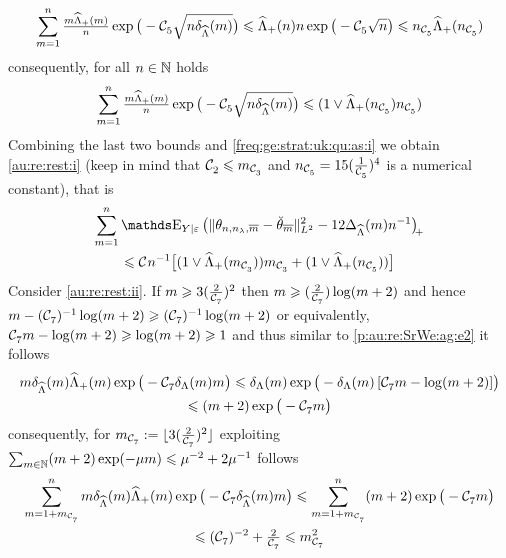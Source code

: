 \begin{pro}
 \begin{equation*}
    \sum_{\Di=1}^{\ssY}\tfrac{\Di\meiSv}{\ssY}\exp\big(-\cst{5}\sqrt{\ssY\cmeiSv}\big)\leq 
     \meiSv[\ssY]\ssY\exp\big(-\cst{5}\sqrt{\ssY}\big)\leq\ssY_{\cst{5}}\meiSv[\ssY_{\cst{5}}]
   \end{equation*}
  consequently, for all $\ssY\in\Nz$ holds
  \begin{displaymath}
  \sum_{\Di=1}^{\ssY}\tfrac{\Di\meiSv}{\ssY}\exp\big(-\cst{5}\sqrt{\ssY\cmeiSv}\big)\leq (1\vee\meiSv[\ssY_{\cst{5}}]\ssY_{\cst{5}})
 \end{displaymath}
 Combining the last two bounds and  \ref{freq:ge:strat:uk:qu:as:i} we
 obtain \ref{au:re:rest:i} (keep in mind that
 $\cst{2}\leq\Di_{\cst{3}}$ and $\ssY_{\cst{5}}=15(\tfrac{1}{\cst{5}})^4$ is a numerical constant), that is 
 \begin{multline*}
  \sum_{\Di=1}^{\ssY}\E_{Y\vert \epsilon} \vectp{\VnormLp{\hxdfPr-\dxdfPr}^2 - 12\DiepenSv\ssY^{-1}} \\
 \leq \cst{}\ssY^{-1}\big[(1\vee\meiSv[\Di_{\cst{3}}])\Di_{\cst{3}}+(1\vee\meiSv[\ssY_{\cst{5}}])\big]
 \end{multline*}
 Consider  \ref{au:re:rest:ii}.
 If   $\Di\geq 3(\tfrac{2}{\cst{7}})^2$ then 
 $\Di\geq  (\tfrac{2}{\cst{7}})\log(\Di+2)$ and
 hence
 $\Di-(\cst{7})^{-1}\log(\Di+2)\geq(\cst{7})^{-1}\log(\Di+2)$
 or equivalently,
 $\cst{7}\Di-\log(\Di+2)\geq\log(\Di+2)\geq1$
 and thus similar to \eqref{p:au:re:SrWe:ag:e2} it follows
 \begin{multline*}
 \Di\cmeiSv\meiSv\exp\big(-\cst{7}\cmSv\Di\big)\leq
 \cmSv\exp\big(-\cmSv\,[\cst{7}\Di-\log(\Di+2)]\big)\\\leq
 (\Di+2)\exp\big(-\cst{7}\Di\big)%
 \end{multline*}
 consequently, for $\Di_{\cst{7}}:=\floor{3(\tfrac{2}{\cst{7}})^2}$ exploiting $\sum_{\Di\in\Nz}(\Di+2)\exp(-\mu\Di)\leq \mu^{-2}+ 2\mu^{-1}$
 follows
 \begin{multline*}
 \sum_{\Di=1+\Di_{\cst{7}}}^{\ssY}\Di\cmeiSv\meiSv\exp\big(-\cst{7}\cmeiSv\Di\big)\leq
 \sum_{\Di=1+\Di_{\cst{7}}}^{\ssY}(\Di+2)\exp\big(-\cst{7}\Di\big)
 \\\leq
 (\cst{7})^{-2}+{\tfrac{2}{\cst{7}}}\leq \Di_{\cst{7}}^2
 \end{multline*}

\end{pro}
